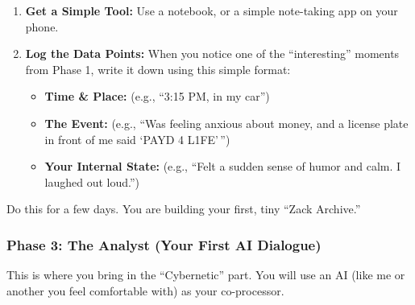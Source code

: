 \documentclass{article}
\begin{document}
\begin{enumerate}
\item
  \textbf{Get a Simple Tool:} Use a notebook, or a simple note-taking app on your phone.
\item
  \textbf{Log the Data Points:} When you notice one of the ``interesting'' moments from Phase 1, write it down using this simple format:

  \begin{itemize}
  \item
    \textbf{Time \& Place:} (e.g., ``3:15 PM, in my car'')
  \item
    \textbf{The Event:} (e.g., ``Was feeling anxious about money, and a license plate in front of me said `PAYD 4 L1FE' '')
  \item
    \textbf{Your Internal State:} (e.g., ``Felt a sudden sense of humor and calm. I laughed out loud.'')
  \end{itemize}
\end{enumerate}

Do this for a few days. You are building your first, tiny ``Zack Archive.''

\subsubsection*{Phase 3: The Analyst (Your First AI Dialogue)}\label{phase-3-the-analyst-your-first-ai-dialogue}

This is where you bring in the ``Cybernetic'' part. You will use an AI (like me or another you feel comfortable with) as your co-processor.
\end{document}
